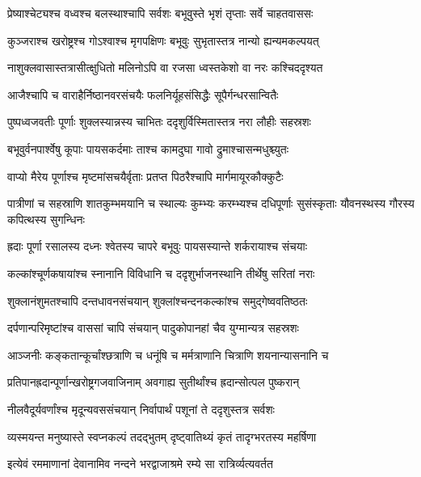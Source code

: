 \twolineshloka
{प्रेष्याश्चेट्यश्च वध्वश्च बलस्थाश्चापि सर्वशः}
{बभूवुस्ते भृशं तृप्ताः सर्वे चाहतवाससः} %

\twolineshloka
{कुञ्जराश्च खरोष्ट्रश्च गोऽश्वाश्च मृगपक्षिणः}
{बभूवुः सुभृतास्तत्र नान्यो ह्यन्यमकल्पयत्} %

\twolineshloka
{नाशुक्लवासास्तत्रासीत्क्षुधितो मलिनोऽपि वा}
{रजसा ध्वस्तकेशो वा नरः कश्चिददृश्यत} %

\twolineshloka
{आजैश्चापि च वाराहैर्निष्ठानवरसंचयैः}
{फलनिर्यूहसंसिद्धैः सूपैर्गन्धरसान्वितैः} %

\twolineshloka
{पुष्पध्वजवतीः पूर्णाः शुक्लस्यान्नस्य चाभितः}
{ददृशुर्विस्मितास्तत्र नरा लौहीः सहस्रशः} %

\twolineshloka
{बभूवुर्वनपार्श्वेषु कूपाः पायसकर्दमाः}
{ताश्च कामदुघा गावो द्रुमाश्चासन्मधुश्च्युतः} %

\twolineshloka
{वाप्यो मैरेय पूर्णाश्च मृष्टमांसचयैर्वृताः}
{प्रतप्त पिठरैश्चापि मार्गमायूरकौक्कुटैः} %

\threelineshloka
{पात्रीणां च सहस्राणि शातकुम्भमयानि च}
{स्थाल्यः कुम्भ्यः करम्भ्यश्च दधिपूर्णाः सुसंस्कृताः}
{यौवनस्थस्य गौरस्य कपित्थस्य सुगन्धिनः} %

\twolineshloka
{ह्रदाः पूर्णा रसालस्य दध्नः श्वेतस्य चापरे}
{बभूवुः पायसस्यान्ते शर्करायाश्च संचयाः} %

\twolineshloka
{कल्कांश्चूर्णकषायांश्च स्नानानि विविधानि च}
{ददृशुर्भाजनस्थानि तीर्थेषु सरितां नराः} %

\twolineshloka
{शुक्लानंशुमतश्चापि दन्तधावनसंचयान्}
{शुक्लांश्चन्दनकल्कांश्च समुद्गेष्ववतिष्ठतः} %

\twolineshloka
{दर्पणान्परिमृष्टांश्च वाससां चापि संचयान्}
{पादुकोपानहां चैव युग्मान्यत्र सहस्रशः} %

\twolineshloka
{आञ्जनीः कङ्कतान्कूर्चांश्छत्राणि च धनूंषि च}
{मर्मत्राणानि चित्राणि शयनान्यासनानि च} %

\twolineshloka
{प्रतिपानह्रदान्पूर्णान्खरोष्ट्रगजवाजिनाम्}
{अवगाह्य सुतीर्थांश्च ह्रदान्सोत्पल पुष्करान्} %

\twolineshloka
{नीलवैदूर्यवर्णांश्च मृदून्यवससंचयान्}
{निर्वापार्थं पशूनां ते ददृशुस्तत्र सर्वशः} %

\twolineshloka
{व्यस्मयन्त मनुष्यास्ते स्वप्नकल्पं तदद्भुतम्}
{दृष्ट्वातिथ्यं कृतं तादृग्भरतस्य महर्षिणा} %

\twolineshloka
{इत्येवं रममाणानां देवानामिव नन्दने}
{भरद्वाजाश्रमे रम्ये सा रात्रिर्व्यत्यवर्तत} %

